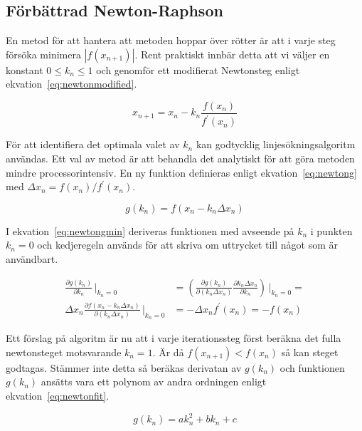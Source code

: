 \subsection{Förbättrad Newton-Raphson}

En metod för att hantera att metoden hoppar över rötter är att i varje steg försöka minimera $|f(x_{n+1})|$.
Rent praktiskt innbär detta att vi väljer en konstant $0 \le k_n \le 1$ och genomför ett modifierat
Newtonsteg enligt ekvation~\eqref{eq:newtonmodified}.

\begin{equation}
\label{eq:newtonmodified}
x_{n+1} = x_n - k_n\frac{f(x_n)}{f^\prime(x_n)}
\end{equation}

\noindent
För att identifiera det optimala valet av $k_n$ kan godtycklig linjesökningsalgoritm användas. Ett val av metod
är att behandla det analytiskt för att göra metoden mindre processorintensiv. En ny funktion definieras
enligt ekvation~\eqref{eq:newtong} med $\Delta x_n = f(x_n)/f^\prime(x_n)$.

\begin{equation}
\label{eq:newtong}
g(k_n) = f(x_n- k_n\Delta x_n)
\end{equation}

\noindent
I ekvation~\eqref{eq:newtongmin} deriveras funktionen med avseende på $k_n$ i punkten $k_n=0$
och kedjeregeln används för att skriva om uttrycket till något som är användbart.

\begin{align}
\frac{\partial g(k_n)}{\partial k_n}\,\bigg|_{k_n=0} & = 
\left(\frac{\partial g(k_n)}{\partial (k_n\Delta x_n)}
\frac{\partial k_n \Delta x_n}{\partial k_n}\right)\,\bigg|_{k_n=0} = \nonumber \\
\Delta x_n \frac{\partial f(x_n- k_n\Delta x_n)}{\partial (k_n\Delta x_n)}\,\bigg|_{k_n=0} & = 
-\Delta x_n f^\prime(x_n) = - f(x_n)
\label{eq:newtongmin}
\end{align}

\noindent
Ett förslag på algoritm är nu att i varje iterationssteg först beräkna det fulla newtonsteget motsvarande $k_n=1$.
Är då $f(x_{n+1}) < f(x_n)$ så kan steget godtagas. Stämmer inte detta så beräkas derivatan av $g(k_n)$ och
funktionen $g(k_n)$ ansätts vara ett polynom av andra ordningen enligt ekvation~\eqref{eq:newtonfit}.

\begin{equation}
\label{eq:newtonfit}
g(k_n) = ak^2_n + bk_n + c
\end{equation}

